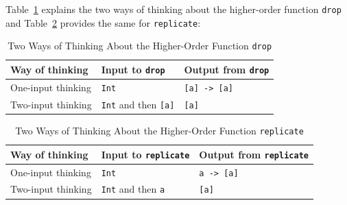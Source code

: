 Table~\ref{tbl6_15-1} explains the two ways of thinking about the higher-order 
function \verb|drop| and Table~\ref{tbl6_15-2} provides the same for \verb|replicate|:

\begin{table}[!ht]
    \begin{tabular}{ l l l}
        \hline
        \textbf{Way of thinking} & \textbf{Input to } \verb|drop| 
        & \textbf{Output from } \verb|drop| \\
        \hline
        One-input thinking & \verb|Int| & \verb|[a] -> [a]| \\
        Two-input thinking & \verb|Int| and then \verb|[a]| 
                           & \verb|[a]| \\
       \hline
    \end{tabular}
    \caption{Two Ways of Thinking About the Higher-Order Function \texttt{drop}
    \label{tbl6_15-1}}
\end{table}

\begin{table}[!ht]
    \begin{tabular}{ l l l}
        \hline
        \textbf{Way of thinking} & \textbf{Input to } \verb|replicate| 
        & \textbf{Output from } \verb|replicate| \\
        \hline
        One-input thinking & \verb|Int| & \verb|a -> [a]| \\
        Two-input thinking & \verb|Int| and then \verb|a| 
                           & \verb|[a]| \\
       \hline
    \end{tabular}
    \caption{Two Ways of Thinking About the Higher-Order Function \texttt{replicate}
    \label{tbl6_15-2}}
\end{table}
